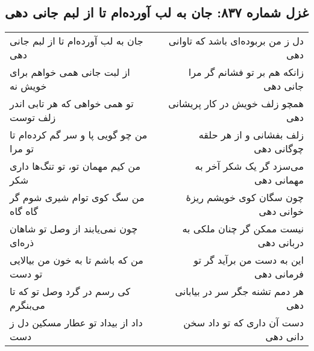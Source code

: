 \begin{center}
\section*{غزل شماره ۸۳۷: جان به لب آورده‌ام تا از لبم جانی دهی}
\label{sec:837}
\begin{longtable}{l p{0.5cm} r}
جان به لب آورده‌ام تا از لبم جانی دهی
&&
دل ز من بربوده‌ای باشد که تاوانی دهی
\\
از لبت جانی همی خواهم برای خویش نه
&&
زانکه هم بر تو فشانم گر مرا جانی دهی
\\
تو همی خواهی که هر تابی اندر زلف توست
&&
همچو زلف خویش در کار پریشانی دهی
\\
من چو گویی پا و سر گم کرده‌ام تا تو مرا
&&
زلف بفشانی و از هر حلقه چوگانی دهی
\\
من کیم مهمان تو، تو تنگ‌ها داری شکر
&&
می‌سزد گر یک شکر آخر به مهمانی دهی
\\
من سگ کوی توام شیری شوم گر گاه گاه
&&
چون سگان کوی خویشم ریزهٔ خوانی دهی
\\
چون نمی‌یابند از وصل تو شاهان ذره‌ای
&&
نیست ممکن گر چنان ملکی به دربانی دهی
\\
من که باشم تا به خون من بیالایی تو دست
&&
این به دست من برآید گر تو فرمانی دهی
\\
کی رسم در گرد وصل تو که تا می‌بنگرم
&&
هر دمم تشنه جگر سر در بیابانی دهی
\\
داد از بیداد تو عطار مسکین دل ز دست
&&
دست آن داری که تو داد سخن دانی دهی
\\
\end{longtable}
\end{center}
